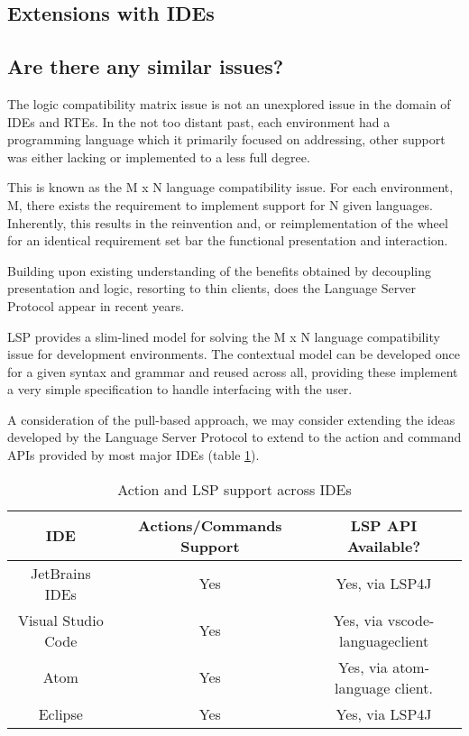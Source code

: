 \subsection{Extensions with IDEs}


\subsection{Are there any similar issues?}

The logic compatibility matrix issue is not an unexplored issue in the domain of IDEs and RTEs. In the not too distant past, each environment had a programming language which it primarily focused on addressing, other support was either lacking or implemented to a less full degree. 

This is known as the M x N language compatibility issue. For each environment, M, there exists the requirement to implement support for N given languages. Inherently, this results in the reinvention and, or reimplementation of the wheel for an identical requirement set bar the functional presentation and interaction.

Building upon existing understanding of the benefits obtained by decoupling presentation and logic, resorting to thin clients, does the Language Server Protocol \parencite{lspGitHubSiteMSFT} appear in recent years.

LSP provides a slim-lined model for solving the M x N language compatibility issue for development environments. The contextual model can be developed once for a given syntax and grammar and reused across all, providing these implement a very simple specification to handle interfacing with the user.

A consideration of the pull-based approach, we may consider extending the ideas developed by the Language Server Protocol to extend to the action and command APIs provided by most major IDEs (table \ref{table:1}).

\begin{table}[h!]
	\centering
	\begin{tabular}{ | c | c | c |}
		\hline
		IDE & Actions/Commands Support & LSP API Available?\\
		\hline
		\hline
		JetBrains IDEs & Yes & Yes, via LSP4J\\ 
		Visual Studio Code & Yes & Yes, via vscode-languageclient \\
		Atom & Yes & Yes, via atom-language client.\\
		Eclipse & Yes & Yes, via LSP4J\\
		\hline
	\end{tabular}
	\caption{Action and LSP support across IDEs}
	\label{table:1}
\end{table}
